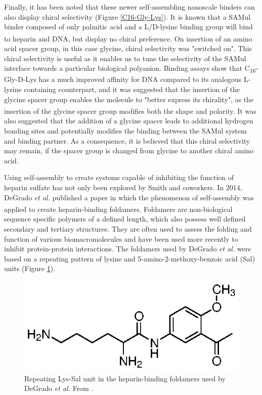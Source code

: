 Finally, it has been noted that these newer self-assembling nanoscale binders can also display chiral selectivity (Figure \ref{C16-Gly-Lys}).  It is known that a SAMul binder composed of only palmitic acid and a L/D-lysine binding group will bind to heparin and DNA, but display no chiral preference.\textsuperscript{\cite{Chan2016ChiralBinding}} On insertion of an amino acid spacer group, in this case glycine, chiral selectivity was "switched on".  This chiral selectivity is useful as it enables us to tune the selectivity of the SAMul interface towards a particular biological polyanion. Binding assays show that C\textsubscript{16}-Gly-D-Lys has a much improved affinity for DNA compared to its analogous L-lysine containing counterpart, and it was suggested that the insertion of the glycine spacer group enables the molecule to "better express its chirality", as the insertion of the glycine spacer group modifies both the shape and polarity.\textsuperscript{\cite{Chan2016ChiralBinding}} It was also suggested that the addition of a glycine spacer leads to additional hydrogen bonding sites and potentially modifies the binding between the SAMul system and binding partner.  As a consequence, it is believed that this chiral selectivity may remain, if the spacer group is changed from glycine to another chiral amino acid. 

Using self-assembly to create systems capable of inhibiting the function of heparin sulfate has not only been explored by Smith and coworkers. In 2014, DeGrado \textit{et al.} published a paper in which the phenomenon of self-assembly was applied to create heparin-binding foldamers.\textsuperscript{\cite{Montalvo2014DeInteractions}} Foldamers are non-biological sequence specific polymers of a defined length, which also possess well defined secondary and tertiary structures. They are often used to assess the folding and function of various biomacromolecules and have been used more recently to inhibit protein-protein interactions. The foldamers used by DeGrado \textit{et al.} were based on a repeating pattern of lysine and 5-amino-2-methoxy-benzoic acid (Sal) units (Figure \ref{Lys-Sal_foldamer}).

\begin{figure} [ht!]
\centering
\includegraphics{Figures/Lys-Sal_foldamer.eps}
\caption{Repeating Lys-Sal unit in the heparin-binding foldamers used by DeGrado \textit{et al.} From \cite{Montalvo2014DeInteractions}.}
\label{Lys-Sal_foldamer}
\end{figure}

